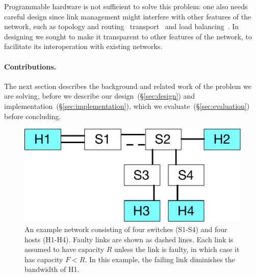 Programmable hardware is not sufficient to solve this problem: one
also needs careful design since link management might interfere with
other features of the network, such as topology and routing~
\cite{Greenberg:2011:VSF:1897852.1897877,
NiranjanMysore:2009:PSF:1594977.1592575,
Agarwal:2014:SMS:2620728.2620758}
transport~\cite{Raiciu:2011:IDP:2043164.2018467,Alizadeh:2010:DCT:1851275.1851192}
and load balancing~\cite{Alizadeh:2014:CDC:2740070.2626316}.
In designing \OurSys we sought to make it transparent to other
features of the network, to facilitate its interoperation with
existing networks.

\paragraph{Contributions.}

The next section describes the background and related work of the problem we
are solving, before we describe our design~(\S\ref{sec:design}) and
implementation~(\S\ref{sec:implementation}), which we
evaluate~(\S\ref{sec:evaluation}) before concluding.

\begin{figure}
  \centering
  \includegraphics[width=0.3\paperwidth]{example_network.pdf}
  \caption{\label{fig:example-net}An example network consisting of four
    switches (S1-S4) and four hosts (H1-H4). Faulty links are shown as dashed lines.
    Each link is assumed to have capacity $R$ unless the link is faulty, in
    which case it has capacity $F < R$.  In this example, the failing link
    diminishes the bandwidth of H1.}
\end{figure}
